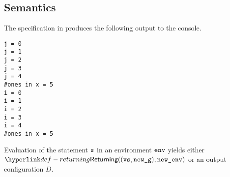 \subsection{Semantics}
The specification in  produces the following output to the console.
\begin{Verbatim}[fontsize=\footnotesize, frame=single]
j = 0
j = 1
j = 2
j = 3
j = 4
#ones in x = 5
i = 0
i = 1
i = 2
i = 3
i = 4
#ones in x = 5
\end{Verbatim}

\ProseParagraph
Evaluation of the statement $\texttt{s}$ in an environment $\texttt{env}$ yields
either \\ $\Returning((\vvs, \newg), \newenv)$ or an output configuration $D$.

